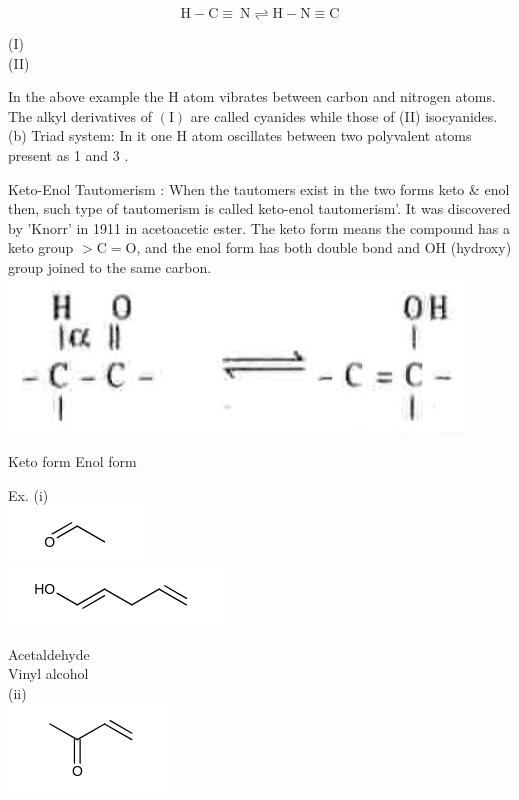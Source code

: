 \documentclass[10pt]{article}
\begin{document}
$$
\mathrm{H}-\mathrm{C} \equiv \mathrm{~N} \rightleftharpoons \mathrm{H}-\mathrm{N} \equiv \mathrm{C}
$$

(I)\\
(II)

In the above example the H atom vibrates between carbon and nitrogen atoms. The alkyl derivatives of $(\mathrm{I})$ are called cyanides while those of (II) isocyanides.\\
(b) Triad system: In it one H atom oscillates between two polyvalent atoms present as 1 and 3 .

Keto-Enol Tautomerism : When the tautomers exist in the two forms keto \& enol then, such type of tautomerism is called keto-enol tautomerism'. It was discovered by 'Knorr' in 1911 in acetoacetic ester. The keto form means the compound has a keto group $>\mathrm{C}=\mathrm{O}$, and the enol form has both double bond and OH (hydroxy) group joined to the same carbon.\\
\includegraphics[max width=\textwidth, center]{2025_01_28_8470952b98110cec3aabg-041}

Keto form Enol form

Ex. (i)\\
\includegraphics{smile-5777a385ec41a6fc2f5fa73f00e4fa75f59e2853}\\
\includegraphics{smile-4f42bd2483a5ee7a7f44f1ee72b3f91fb63ad6e4}

Acetaldehyde\\
Vinyl alcohol\\
(ii)\\
\includegraphics{smile-61695e219a6d89ae7d0a309f2953a64ff9bccab2}
\end{document}
